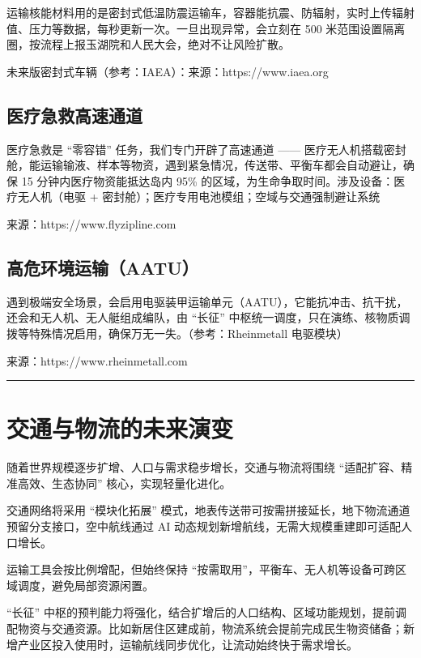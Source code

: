 运输核能材料用的是密封式低温防震运输车，容器能抗震、防辐射，实时上传辐射值、压力等数据，每秒更新一次。一旦出现异常，会立刻在 500 米范围设置隔离圈，按流程上报玉湖院和人民大会，绝对不让风险扩散。

未来版密封式车辆（参考：IAEA）：来源：https://www.iaea.org

\subsection{医疗急救高速通道}\label{ux533bux7597ux6025ux6551ux9ad8ux901fux901aux9053}

医疗急救是 ``零容错'' 任务，我们专门开辟了高速通道 ------ 医疗无人机搭载密封舱，能运输输液、样本等物资，遇到紧急情况，传送带、平衡车都会自动避让，确保 15 分钟内医疗物资能抵达岛内 95\% 的区域，为生命争取时间。涉及设备：医疗无人机（电驱 + 密封舱）；医疗专用电池模组；空域与交通强制避让系统

来源：https://www.flyzipline.com

\subsection{高危环境运输（AATU）}\label{ux9ad8ux5371ux73afux5883ux8fd0ux8f93aatu}

遇到极端安全场景，会启用电驱装甲运输单元（AATU），它能抗冲击、抗干扰，还会和无人机、无人艇组成编队，由 ``长征'' 中枢统一调度，只在演练、核物质调拨等特殊情况启用，确保万无一失。（参考：Rheinmetall 电驱模块）

来源：https://www.rheinmetall.com

\begin{center}\rule{0.5\linewidth}{0.5pt}\end{center}

\section{交通与物流的未来演变}\label{ux4ea4ux901aux4e0eux7269ux6d41ux7684ux672aux6765ux6f14ux53d8}

随着世界规模逐步扩增、人口与需求稳步增长，交通与物流将围绕 ``适配扩容、精准高效、生态协同'' 核心，实现轻量化进化。

交通网络将采用 ``模块化拓展'' 模式，地表传送带可按需拼接延长，地下物流通道预留分支接口，空中航线通过 AI 动态规划新增航线，无需大规模重建即可适配人口增长。

运输工具会按比例增配，但始终保持 ``按需取用''，平衡车、无人机等设备可跨区域调度，避免局部资源闲置。

``长征'' 中枢的预判能力将强化，结合扩增后的人口结构、区域功能规划，提前调配物资与交通资源。比如新居住区建成前，物流系统会提前完成民生物资储备；新增产业区投入使用时，运输航线同步优化，让流动始终快于需求增长。


